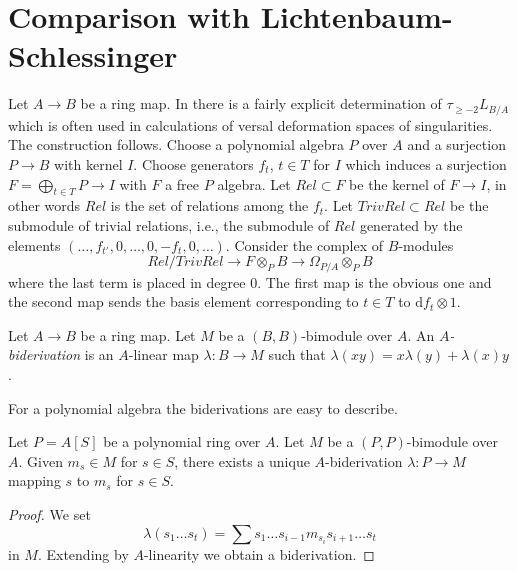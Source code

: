 \section{Comparison with Lichtenbaum-Schlessinger}
\label{section-compare-higher}

\noindent
Let $A \to B$ be a ring map. In \cite{Lichtenbaum-Schlessinger}
there is a fairly explicit determination of $\tau_{\geq -2}L_{B/A}$
which is often used in calculations of versal deformation spaces of
singularities. The construction follows.
Choose a polynomial algebra $P$ over $A$
and a surjection $P \to B$ with kernel $I$. Choose generators
$f_t$, $t \in T$ for $I$ which induces a surjection
$F = \bigoplus_{t \in T} P \to I$ with $F$ a free $P$ algebra.
Let $Rel \subset F$ be the kernel of $F \to I$, in other words
$Rel$ is the set of relations among the $f_t$. Let $TrivRel \subset Rel$
be the submodule of trivial relations, i.e., the submodule of $Rel$
generated by the elements $(\ldots, f_{t'}, 0, \ldots, 0, -f_t, 0, \ldots)$.
Consider the complex of $B$-modules
\begin{equation}
\label{equation-lichtenbaum-schlessinger}
Rel/TrivRel \longrightarrow
F \otimes_P B \longrightarrow
\Omega_{P/A} \otimes_P B
\end{equation}
where the last term is placed in degree $0$. The first map is the obvious
one and the second map sends the basis element corresponding to $t \in T$
to $\text{d}f_t \otimes 1$.

\begin{definition}
\label{definition-biderivation}
Let $A \to B$ be a ring map. Let $M$ be a $(B, B)$-bimodule
over $A$. An {\it $A$-biderivation} is an $A$-linear map $\lambda : B \to M$
such that $\lambda(xy) = x\lambda(y) + \lambda(x)y$.
\end{definition}

\noindent
For a polynomial algebra the biderivations are easy to describe.

\begin{lemma}
\label{lemma-polynomial-ring-unique}
Let $P = A[S]$ be a polynomial ring over $A$. Let $M$ be a $(P, P)$-bimodule
over $A$. Given $m_s \in M$ for $s \in S$, there exists a unique
$A$-biderivation $\lambda : P \to M$ mapping $s$ to $m_s$ for $s \in S$.
\end{lemma}

\begin{proof}
We set
$$
\lambda(s_1 \ldots s_t) =
\sum s_1 \ldots s_{i - 1} m_{s_i} s_{i + 1} \ldots s_t
$$
in $M$. Extending by $A$-linearity we obtain a biderivation.
\end{proof}

